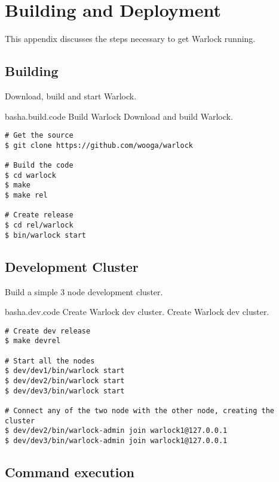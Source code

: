 \chapter{Building and Deployment}
\label{appendix:building.deployment}

This appendix discusses the steps necessary to get Warlock running.%

\section{Building}

Download, build and start Warlock.

\begin{scode}{bash}{a.build.code}{%
  Build Warlock}{%
  Download and build Warlock.}
  \begin{lstlisting}
# Get the source  
$ git clone https://github.com/wooga/warlock

# Build the code
$ cd warlock
$ make
$ make rel

# Create release
$ cd rel/warlock
$ bin/warlock start
  \end{lstlisting}
\end{scode}

\section{Development Cluster}

Build a simple 3 node development cluster.

\begin{scode}{bash}{a.dev.code}{%
  Create Warlock dev cluster.}{%
  Create Warlock dev cluster.}
  \begin{lstlisting}
# Create dev release
$ make devrel

# Start all the nodes
$ dev/dev1/bin/warlock start
$ dev/dev2/bin/warlock start
$ dev/dev3/bin/warlock start

# Connect any of the two node with the other node, creating the cluster
$ dev/dev2/bin/warlock-admin join warlock1@127.0.0.1
$ dev/dev3/bin/warlock-admin join warlock1@127.0.0.1
  \end{lstlisting}
\end{scode}

\section{Command execution}

